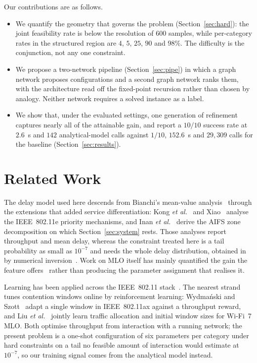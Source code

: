 \documentclass[journal,a4paper,comsoc,twocolumn]{IEEEtran}
\begin{document}
Our contributions are as follows.

\begin{itemize}[leftmargin=*,itemsep=1pt,topsep=2pt]
\item We quantify the geometry that governs the problem
(Section~\ref{sec:hard}): the joint feasibility rate is below the resolution of
600 samples, while per-category rates in the structured region are $4$, $5$,
$25$, $90$ and $98\%$. The difficulty is the conjunction, not any one
constraint.
\item We propose a two-network pipeline (Section~\ref{sec:pipe}) in which a
graph network proposes configurations and a second graph network ranks them,
with the architecture read off the fixed-point recursion rather than chosen by
analogy. Neither network requires a solved instance as a label.
\item We show that, under the evaluated settings, one generation of
refinement captures nearly all of the attainable gain, and report a $10/10$
success rate at $2.6$~s and $142$ analytical-model calls
against $1/10$, $152.6$~s and $29{,}309$ calls for the baseline
(Section~\ref{sec:results}).
\end{itemize}

\section{Related Work}
\label{sec:related}

The delay model used here descends from Bianchi's mean-value
analysis~\cite{Bianchi2000} through the extensions that added service
differentiation: Kong \emph{et al.}~\cite{Kong2004} and Xiao~\cite{Xiao2005}
analyse the IEEE~802.11e priority mechanisms, and Inan \emph{et
al.}~\cite{Inan2009} derive the AIFS zone decomposition on which
Section~\ref{sec:system} rests. Those analyses report throughput and mean
delay, whereas the constraint treated here is a tail probability as small as
$10^{-7}$ and needs the whole delay distribution, obtained
in~\cite{Yi2025} by numerical inversion~\cite{AbateWhitt1992}. Work on MLO
itself has mainly quantified the gain the feature
offers~\cite{LopezRaventos2022,Naik2021} rather than producing the parameter
assignment that realises it.

Learning has been applied across the IEEE~802.11 stack~\cite{Szott2022}. The
nearest strand tunes contention windows online by reinforcement learning:
Wydma\'{n}ski and Szott~\cite{Wydmanski2021} adapt a single window in
IEEE~802.11ax against a throughput reward, and Liu \emph{et al.}~\cite{Liu2026}
jointly learn traffic allocation and initial window sizes for Wi-Fi~7 MLO. Both
optimise throughput from interaction with a running network; the present problem
is a one-shot configuration of six parameters per category under hard
constraints on a tail no feasible amount of interaction would estimate at
$10^{-7}$, so our training signal comes from the analytical model instead.
\end{document}
